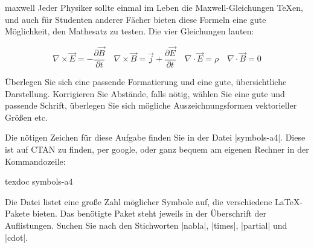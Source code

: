 \documentclass[
	draft,
	blatt=4,
	ausgabe=07.\,05.\,2010,
	rückgabe=14.\,05.\,2010
]{lcourse-hd}
\begin{document}
\begin{exercise}[
  name={Maxwellgleichungen},
  punkte=5,
  abgabe = Quellcode per Mail und ausgedruckt{,} fertiges Dokument ausgedruckt. Bitte Studienfach mit angeben!]{maxwell}
Jeder Physiker sollte einmal im Leben die Maxwell-Gleichungen \TeX{}en, und auch für Studenten anderer Fächer bieten diese Formeln eine gute Möglichkeit, den Mathesatz zu testen. Die vier Gleichungen lauten:

\[\textstyle \nabla \times \vec E = -\frac{\partial \vec B}{\partial t}\quad \nabla \times \vec B = \vec j + \frac{\partial \vec E}{\partial t}\quad \nabla \cdot \vec E = \rho\quad 
\nabla \cdot \vec B = 0\]

Überlegen Sie sich eine passende Formatierung und eine gute, übersichtliche Darstellung. Korrigieren Sie Abstände, falls nötig, wählen Sie eine gute und passende Schrift, überlegen Sie sich mögliche Auszeichnungsformen vektorieller Größen etc.

Die nötigen Zeichen für diese Aufgabe finden Sie in der Datei |symbols-a4|. Diese ist auf CTAN zu finden, per google, oder ganz bequem am eigenen Rechner in der Kommandozeile:
\begin{lcode}
texdoc symbols-a4
\end{lcode}
Die Datei listet eine große Zahl möglicher Symbole auf, die verschiedene \LaTeX-Pakete bieten. Das benötigte Paket steht jeweils in der Überschrift der Auflistungen. Suchen Sie nach den Stichworten |nabla|, |times|, |partial| und |cdot|.
\end{exercise}
\end{document}
